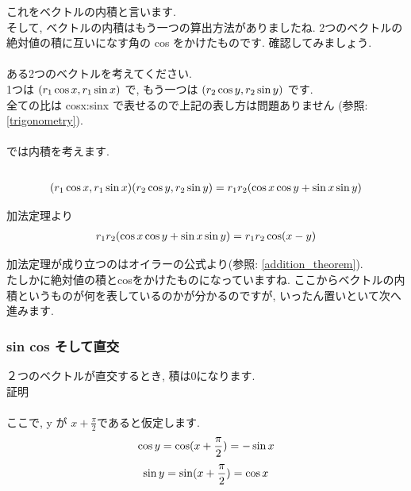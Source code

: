 \documentclass[11pt,a4paper]{jreport}
\begin{document}
これをベクトルの内積と言います.\\
そして, ベクトルの内積はもう一つの算出方法がありましたね. 2つのベクトルの絶対値の積に互いになす角の cos をかけたものです. 確認してみましょう.\\
\\
ある2つのベクトルを考えてください.\\
1つは $(\mathstrut r_1\cos x , \mathstrut r_1\sin x)$ で, もう一つは 
$(\mathstrut r_2\cos y , \mathstrut r_2\sin y)$ です.
\\
全ての比は cosx:sinx で表せるので上記の表し方は問題ありません (参照: \ref{trigonometry}).\\
\\
では内積を考えます.\\
\\
\begin{eqnarray}
(\mathstrut r_1\cos x, \mathstrut r_1\sin x)(\mathstrut r_2\cos y, \mathstrut r_2\sin y) = \mathstrut r_1\mathstrut r_2(\cos x\cos y + \sin x\sin y)
\end{eqnarray}

加法定理より
\begin{eqnarray}
\mathstrut r_1\mathstrut r_2(\cos x\cos y + \sin x\sin y) = \mathstrut r_1\mathstrut r_2\cos (\mathstrut x- \mathstrut y)
\end{eqnarray}

加法定理が成り立つのはオイラーの公式より(参照: \ref{addition_theorem}).\\
たしかに絶対値の積とcosをかけたものになっていますね. ここからベクトルの内積というものが何を表しているのかが分かるのですが, いったん置いといて次へ進みます.\\

\subsubsection{sin cos そして直交}
２つのベクトルが直交するとき, 積は0になります.\\
証明\\
\\
ここで, y が $x + \frac{\pi}{2}$であると仮定します.\\
\begin{eqnarray}
\cos y = \cos (\mathstrut x + \frac{\pi}{2}) = -\sin x
\label{eq:costosin}
\end{eqnarray}
\begin{eqnarray}
\sin y = \sin (\mathstrut x + \frac{\pi}{2}) = \cos x
\label{eq:sintocos}
\end{eqnarray}
\end{document}
